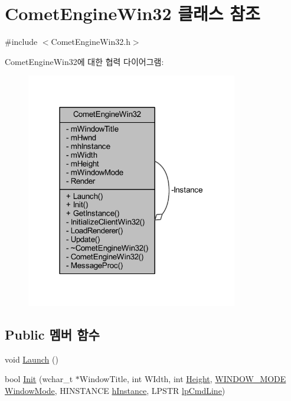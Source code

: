 \hypertarget{class_comet_engine_1_1_comet_engine_win32}{}\section{Comet\+Engine\+Win32 클래스 참조}
\label{class_comet_engine_1_1_comet_engine_win32}


{\ttfamily \#include $<$Comet\+Engine\+Win32.\+h$>$}



Comet\+Engine\+Win32에 대한 협력 다이어그램\+:\nopagebreak
\begin{figure}[H]
\begin{center}
\leavevmode
\includegraphics[width=262pt]{class_comet_engine_1_1_comet_engine_win32__coll__graph}
\end{center}
\end{figure}
\subsection*{Public 멤버 함수}
\begin{DoxyCompactItemize}
\item 
void \hyperlink{class_comet_engine_1_1_comet_engine_win32_abe9b413e3c019ccee4f87ab0071c5aad}{Launch} ()
\item 
bool \hyperlink{class_comet_engine_1_1_comet_engine_win32_a1663bd9ecefc952f3f74065a592ad663}{Init} (wchar\+\_\+t $\ast$Window\+Title, int W\+Idth, int \hyperlink{_d_l_l_comet_engine_win32_8cpp_afd53bc431b967813e00ae3cfecd5c548}{Height}, \hyperlink{namespace_comet_engine_abdc5ec13bf1dfb1d26eb0bcc9da0ddad}{W\+I\+N\+D\+O\+W\+\_\+\+M\+O\+DE} \hyperlink{_d_l_l_comet_engine_win32_8cpp_a319b6c977f6b5f638f8246c67a367768}{Window\+Mode}, H\+I\+N\+S\+T\+A\+N\+CE \hyperlink{_d_l_l_comet_engine_win32_8cpp_a5fb685beb2aed3ecdbad03b352111398}{h\+Instance}, L\+P\+S\+TR \hyperlink{_d_l_l_comet_engine_win32_8cpp_af1ff5ad877f6069d41720b03c7769227}{lp\+Cmd\+Line})
\end{DoxyCompactItemize}
